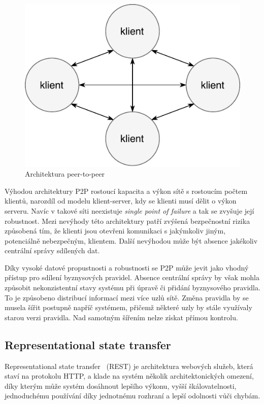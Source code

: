 \begin{figure}[t]
    \centering
    \includegraphics[keepaspectratio=true, width=0.4\linewidth]{figures/peer-to-peer.pdf}
    \caption{Architektura peer-to-peer}
    \label{fig:peer-to-peer}
\end{figure}


Výhodou architektury \gls{P2P} rostoucí kapacita a výkon sítě s rostoucím počtem klientů,
narozdíl od modelu klient-server, kdy se klienti musí dělit o výkon serveru.
Navíc v takové síti neexistuje \textit{single point of failure} a tak se zvyšuje její robustnost.
Mezi nevýhody této architektury patří zvýšená bezpečnostní rizika způsobená tím,
že klienti jsou otevřeni komunikaci s jakýmkoliv jiným, potenciálně nebezpečným, klientem.
Další nevýhodou může být absence jakékoliv centrální správy sdílených dat.

Díky vysoké datové propustnosti a robustnosti se \gls{P2P} může jevit jako vhodný přístup pro
sdílení byznysových pravidel. Absence centrální správy by však mohla způsobit nekonzistentní stavy
systému při úpravě či přidání byznysového pravidla. To je způsobeno distribucí informací mezi více uzlů sítě.
Změna pravidla by se musela šířit postupně napříč systémem, přičemž některé uzly by stále využívaly starou
verzi pravidla. Nad samotným šířením nelze získat přímou kontrolu.

\subsection{Representational state transfer}\label{sec:rest}

Representational state transfer~\cite{fielding2000rest} (\gls{REST}) je architektura
webových služeb, která staví na protokolu \gls{HTTP}, a klade na systém
několik architektonických omezení, díky kterým může systém dosáhnout
lepšího výkonu, vyšší škálovatelnosti, jednoduchému používání díky jednotnému rozhraní
a lepší odolnosti vůči chybám.

